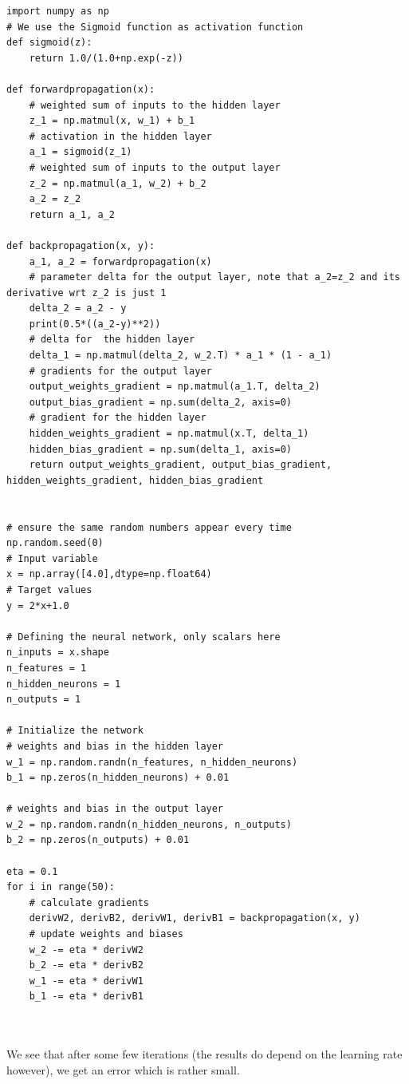 \documentclass{beamer}
\begin{document}
\begin{frame}
\begin{verbatim}
import numpy as np
# We use the Sigmoid function as activation function
def sigmoid(z):
    return 1.0/(1.0+np.exp(-z))

def forwardpropagation(x):
    # weighted sum of inputs to the hidden layer
    z_1 = np.matmul(x, w_1) + b_1
    # activation in the hidden layer
    a_1 = sigmoid(z_1)
    # weighted sum of inputs to the output layer
    z_2 = np.matmul(a_1, w_2) + b_2
    a_2 = z_2
    return a_1, a_2

def backpropagation(x, y):
    a_1, a_2 = forwardpropagation(x)
    # parameter delta for the output layer, note that a_2=z_2 and its derivative wrt z_2 is just 1
    delta_2 = a_2 - y
    print(0.5*((a_2-y)**2))
    # delta for  the hidden layer
    delta_1 = np.matmul(delta_2, w_2.T) * a_1 * (1 - a_1)
    # gradients for the output layer
    output_weights_gradient = np.matmul(a_1.T, delta_2)
    output_bias_gradient = np.sum(delta_2, axis=0)
    # gradient for the hidden layer
    hidden_weights_gradient = np.matmul(x.T, delta_1)
    hidden_bias_gradient = np.sum(delta_1, axis=0)
    return output_weights_gradient, output_bias_gradient, hidden_weights_gradient, hidden_bias_gradient


# ensure the same random numbers appear every time
np.random.seed(0)
# Input variable
x = np.array([4.0],dtype=np.float64)
# Target values
y = 2*x+1.0 

# Defining the neural network, only scalars here
n_inputs = x.shape
n_features = 1
n_hidden_neurons = 1
n_outputs = 1

# Initialize the network
# weights and bias in the hidden layer
w_1 = np.random.randn(n_features, n_hidden_neurons)
b_1 = np.zeros(n_hidden_neurons) + 0.01

# weights and bias in the output layer
w_2 = np.random.randn(n_hidden_neurons, n_outputs)
b_2 = np.zeros(n_outputs) + 0.01

eta = 0.1
for i in range(50):
    # calculate gradients
    derivW2, derivB2, derivW1, derivB1 = backpropagation(x, y)
    # update weights and biases
    w_2 -= eta * derivW2
    b_2 -= eta * derivB2
    w_1 -= eta * derivW1
    b_1 -= eta * derivB1



\end{verbatim}


We see that after some few iterations (the results do depend on the learning rate however), we get an error which is rather small.
\end{frame}
\end{document}
